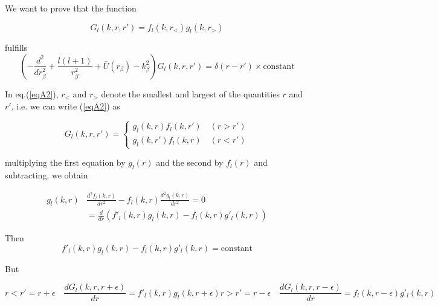 We want to prove that the function

 \begin{equation}\label{eqA2}
G_l(k,r,r')=f_l(k,r_<)g_l(k,r_>)
\end{equation}

fulfills
 \begin{equation}\label{eqA3}
\left( -\frac{d^2}{dr^2_\beta}+\frac{l(l+1)}{r^2_\beta}+\bar U (r_ \beta)-k_\beta^2\right) G_l(k,r,r')=
\delta(r-r')\times \text{constant}
\end{equation}

In eq.(\ref{eqA2}), $r_<$ and $r_>$ denote the smallest and largest of the quantities $r$ and $r'$, i.e. we can write (\ref{eqA2}) as

 \begin{equation}\label{eqA4}
G_l(k,r,r')=
\left \lbrace \begin{aligned}
g_l(k,r)f_l(k,r') \quad (r>r')\\
g_l(k,r')f_l(k,r) \quad (r<r')\end{aligned}
\right.
\end{equation}

multiplying the first equation by $g_l(r)$ and the second by $f_l(r)$ and subtracting, we obtain


 \begin{equation}\label{eqA5}
\begin{split}
g_l(k,r)& \frac{d^2 f_l(k,r)}{dr^2}-f_l(k,r) \frac{d^2 g_l(k,r)}{dr^2}=0\\
&=\frac{d}{dr}(f'_l(k,r)g_l(k,r)-f_l(k,r)g'_l(k,r))
\end{split}
\end{equation}

Then
 \begin{equation}\label{eqA6}
f'_l(k,r)g_l(k,r)-f_l(k,r)g'_l(k,r)=\text{constant}
\end{equation}

But

\begin{subequations}
 \begin{equation}\label{eqA7a}
r<r'=r+\epsilon \quad \frac{dG_l(k,r,r+\epsilon)}{dr}=f'_l(k,r)g_l(k,r+\epsilon)
\end{equation}



\begin{equation}\label{eqA7b}
r>r'=r-\epsilon \quad \frac{dG_l(k,r,r-\epsilon)}{dr}=f_l(k,r-\epsilon)g'_l(k,r)
\end{equation}
\end{subequations}

